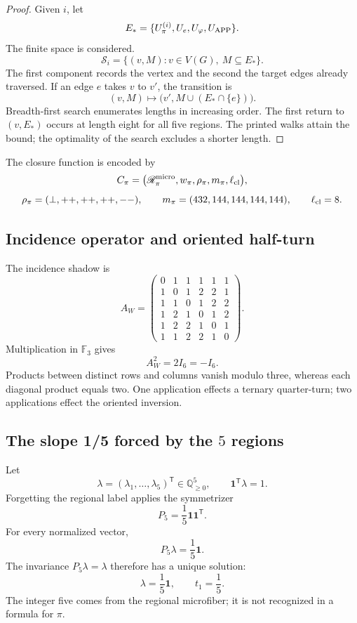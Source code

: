 \begin{proof}
Given \(i\), let
\[
 E_*=\{U_\pi^{(i)},U_e,U_\varphi,U_{\rm APP}\}.
\]
The finite space is considered.
\[
 \mathscr S_i=\{(v,M):v\in V(G),\ M\subseteq E_*\}.
\]
The first component records the vertex and the second the target edges
already traversed. If an edge \(e\) takes \(v\) to \(v'\), the transition is
\[
 (v,M)\longmapsto
 \bigl(v',M\cup(E_*\cap\{e\})\bigr).
\]
Breadth-first search enumerates lengths in increasing order. The first
return to \((v,E_*)\) occurs at length eight for all five regions.
The printed walks attain the bound; the optimality of the search excludes
a shorter length.
\end{proof}

The closure function is encoded by
\[
 \mathfrak C_\pi=
 \bigl(\mathscr R_\pi^{\rm micro},
 w_\pi,\rho_\pi,m_\pi,\ell_{\rm cl}\bigr),
\]
\[
 \rho_\pi=(\perp,++ ,++ ,++ ,--),
 \qquad
 m_\pi=(432,144,144,144,144),
 \qquad
 \ell_{\rm cl}=8.
\]

\subsection{Incidence operator and oriented half-turn}

The incidence shadow is
\[
 A_W=
 \begin{pmatrix}
 0&1&1&1&1&1\\
 1&0&1&2&2&1\\
 1&1&0&1&2&2\\
 1&2&1&0&1&2\\
 1&2&2&1&0&1\\
 1&1&2&2&1&0
 \end{pmatrix}.
\]
Multiplication in \(\mathbb F_3\) gives
\begin{equation}
 \boxed{A_W^2=2I_6=-I_6.}
 \label{p12-83-c9-s1:eq:aw-cuadrado-menos-identidad-pi}
\end{equation}
Products between distinct rows and columns vanish modulo three,
whereas each diagonal product equals two. One application effects a ternary
quarter-turn; two applications effect the oriented inversion.

\subsection{The slope 1/5 forced by the \(5\) regions}

Let
\[
 \lambda=(\lambda_1,\ldots,\lambda_5)^{\mathsf T}
 \in\mathbb Q_{\geq0}^5,
 \qquad
 \mathbf1^{\mathsf T}\lambda=1.
\]
Forgetting the regional label applies the symmetrizer
\[
 P_5=\frac15\mathbf1\mathbf1^{\mathsf T}.
\]
For every normalized vector,
\[
 P_5\lambda=\frac15\mathbf1.
\]
The invariance \(P_5\lambda=\lambda\) therefore has a unique solution:
\begin{equation}
 \boxed{\lambda=\frac15\mathbf1,\qquad t_1=\frac15.}
 \label{p12-83-c9-s1:eq:pendiente-primitiva-pi}
\end{equation}
The integer five comes from the regional microfiber; it is not recognized in a
formula for \(\pi\).

